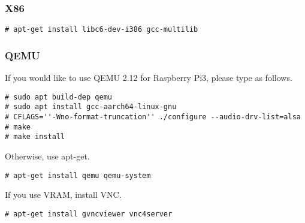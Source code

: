 \subsubsection{X86}

\noindent
\begin{Sbox}
\begin{minipage}[t]{0.975\linewidth}
\begin{verbatim}
# apt-get install libc6-dev-i386 gcc-multilib
\end{verbatim}
\end{minipage}
\end{Sbox}
\fbox{\TheSbox}


\subsubsection*{QEMU}


If you would like to use QEMU 2.12 for Raspberry Pi3, please type as follows.

\noindent
\begin{Sbox}
\begin{minipage}[t]{0.975\linewidth}
\begin{verbatim}
# sudo apt build-dep qemu
# sudo apt install gcc-aarch64-linux-gnu
# CFLAGS=''-Wno-format-truncation'' ./configure --audio-drv-list=alsa
# make
# make install
\end{verbatim}
\end{minipage}
\end{Sbox}
\fbox{\TheSbox}

Otherwise, use apt-get.

\noindent
\begin{Sbox}
\begin{minipage}[t]{0.975\linewidth}
\begin{verbatim}
# apt-get install qemu qemu-system
\end{verbatim}
\end{minipage}
\end{Sbox}
\fbox{\TheSbox}


If you use VRAM, install VNC.

\noindent
\begin{Sbox}
\begin{minipage}[t]{0.975\linewidth}
\begin{verbatim}
# apt-get install gvncviewer vnc4server
\end{verbatim}
\end{minipage}
\end{Sbox}
\fbox{\TheSbox}

